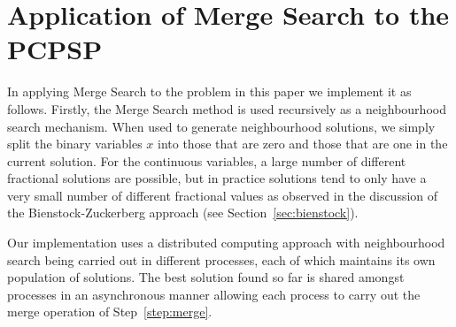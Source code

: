 \documentclass[authoryear,11pt,square,number,times,super,comma]{elsarticle}
\begin{document}
\section{Application of Merge Search to the PCPSP}
In applying Merge Search to the problem in this paper we implement it as
follows. Firstly, the Merge Search method is used recursively as a
neighbourhood search mechanism. When used to generate neighbourhood solutions,
we simply split the binary variables $x$ into those that are zero and those
that are one in the current solution. For the continuous variables, a large
number of different fractional solutions are possible, but in practice
solutions tend to only have a very small number of different fractional
values as observed in the discussion of the Bienstock-Zuckerberg
approach (see Section~\ref{sec:bienstock}).

Our implementation uses a distributed computing approach with neighbourhood
search being carried out in different processes, each of which maintains its own population of solutions. The best solution found so
far is shared amongst processes in an asynchronous manner allowing each
process to carry out the merge operation of Step~\ref{step:merge}.
\end{document}
